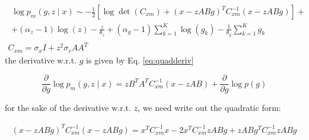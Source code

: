 \documentclass{paper}
\begin{document}
\begin{eqnarray}
\begin{split}
\log p_m(g,z \mid x) \sim -\frac{1}{2} \left[ \log \det (C_{xm}) + (x-zABg)^T C_{xm}^{-1} (x-zABg) \right] + \\
+ (\alpha_z-1)\log(z) - \frac{z}{\theta_z} + (\alpha_g-1)\sum_{k=1}^K \log(g_k) - \frac{1}{\theta_g} \sum_{k=1}^K g_k
\end{split} \\
C_{xm} = \sigma_x I + z^2 \sigma_v AA^T
\end{eqnarray}
%
the derivative w.r.t. $g$ is given by Eq. \ref{eq:quadderiv}

\begin{equation}
\frac{\partial}{\partial g} \log p_m(g,z \mid x) = zB^TA^T C_{xm}^{-1} (x-zAB) + \frac{\partial}{\partial g} \log p(g)
\end{equation}

%
for the sake of the derivative w.r.t. $z$, we need write out the quadratic form:

\begin{equation}
\begin{split}
(x-zABg)^T C_{xm}^{-1} (x-zABg) = x^T C_{xm}^{-1} x - 2 x^T C_{xm}^{-1} zABg + zABg^T C_{xm}^{-1} zABg
\end{split}
\end{equation}
\end{document}
